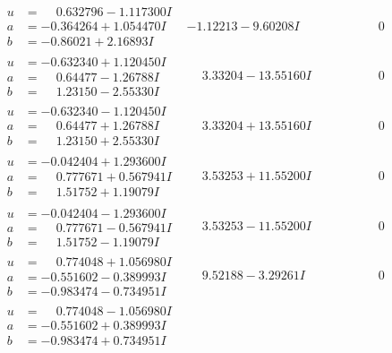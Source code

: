 \documentclass[1p]{elsarticle_modified}
\theoremstyle{definition}
\begin{document}
$$\begin{array}{c|c|c}
\begin{aligned}
u &= \phantom{-}0.632796 - 1.117300 I \\
a &= -0.364264 + 1.054470 I \\
b &= -0.86021 + 2.16893 I\end{aligned}
 & -1.12213 - 9.60208 I & \phantom{-0.000000 } 0 \\ \hline\begin{aligned}
u &= -0.632340 + 1.120450 I \\
a &= \phantom{-}0.64477 - 1.26788 I \\
b &= \phantom{-}1.23150 - 2.55330 I\end{aligned}
 & \phantom{-}3.33204 - 13.55160 I & \phantom{-0.000000 } 0 \\ \hline\begin{aligned}
u &= -0.632340 - 1.120450 I \\
a &= \phantom{-}0.64477 + 1.26788 I \\
b &= \phantom{-}1.23150 + 2.55330 I\end{aligned}
 & \phantom{-}3.33204 + 13.55160 I & \phantom{-0.000000 } 0 \\ \hline\begin{aligned}
u &= -0.042404 + 1.293600 I \\
a &= \phantom{-}0.777671 + 0.567941 I \\
b &= \phantom{-}1.51752 + 1.19079 I\end{aligned}
 & \phantom{-}3.53253 + 11.55200 I & \phantom{-0.000000 } 0 \\ \hline\begin{aligned}
u &= -0.042404 - 1.293600 I \\
a &= \phantom{-}0.777671 - 0.567941 I \\
b &= \phantom{-}1.51752 - 1.19079 I\end{aligned}
 & \phantom{-}3.53253 - 11.55200 I & \phantom{-0.000000 } 0 \\ \hline\begin{aligned}
u &= \phantom{-}0.774048 + 1.056980 I \\
a &= -0.551602 - 0.389993 I \\
b &= -0.983474 - 0.734951 I\end{aligned}
 & \phantom{-}9.52188 - 3.29261 I & \phantom{-0.000000 } 0 \\ \hline\begin{aligned}
u &= \phantom{-}0.774048 - 1.056980 I \\
a &= -0.551602 + 0.389993 I \\
b &= -0.983474 + 0.734951 I\end{aligned}

\end{array}$$
\end{document}
